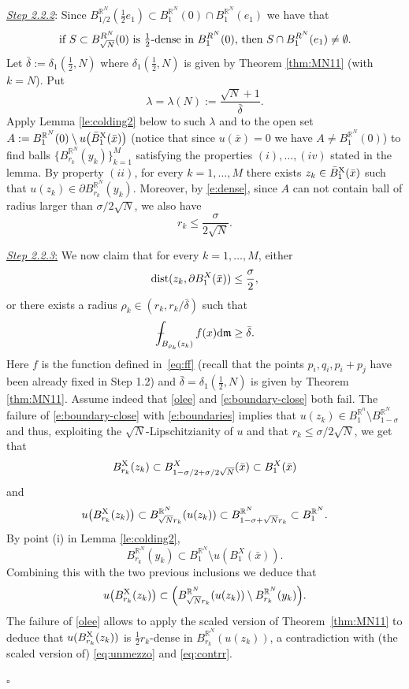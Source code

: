 \documentclass[reqno,11pt]{article}
\numberwithin{equation}{section}
\newcommand{\R}{\mathbb{R}}
\newcommand{\mm}{{\mbox{\boldmath$m$}}}
\renewcommand{\d}{{\mathrm d}}
\newcommand{\mean}[1]{\,-\hskip-1.08em\int_{#1}} %
\renewcommand{\mm}{\mathfrak m}                                %
\renewenvironment{proof}{\removelastskip\par\medskip   %
\noindent{\em Proof} \rm}{\penalty-20\null\hfill$\square$\par\medbreak}
\newcommand{\X}{{\rm X}}
\newcommand{\dist}{{\rm dist}}
\begin{document}
\begin{proof}
{\underline{\emph{Step 2.2.2}}:}  
{Since \(B_{1/2}^{\R^N}(\frac12 e_1)\subset B_{1}^{\R^N}(0)\cap B_1^{\R^N}(e_1)\) we have that
\begin{equation}
\label{eq:unmezzo}
\text{if \(S\subset B^{\mathbb \R^N}_{\sqrt{N}}(0)\) is \(\tfrac12\)-dense in \(B^{\mathbb \R^N}_1(0)\), then  \(S\cap B^{\mathbb \R^N}_1(e_1)\ne \emptyset\)}.
\end{equation}
Let $\bar \delta:=\delta_1(\tfrac12,N)$ where \(\delta_1(\tfrac12,N)\) is  given by Theorem \ref{thm:MN11} (with \(k=N\)). Put
\[
\lambda=\lambda(N):=\frac{\sqrt N+1}{\bar\delta}.
\]
Apply Lemma \ref{le:colding2} below to such $\lambda$ and to the open set $A:=B^{\R^N}_1(0)\setminus u\big({\bar B^\X_1(\bar x)}\big)$ (notice that since $u(\bar x)=0$ we have $A\neq B^{\R^N}_1(0)$) to find balls  \(\{B^{\R^N}_{r_k}(y_k)\}_{k=1}^M\) satisfying the properties $(i),\ldots,(iv)$ stated in the lemma. By property $(ii)$, for every \(k=1,\dots,M\)  there exists \(z_k\in {\bar B_1^{\X}(\bar x)}\) such that \(u(z_k)\in \partial B^{\R^N}_{r_k}(y_k)\). 
Moreover, by \eqref{e:dense}, since \(A\) can not contain ball of radius larger than \(\sigma/2\sqrt{N}\),  we also have  
\[
r_{k}\le \frac{\sigma}{2\sqrt{N}}.
\]
}

{\underline{\emph{Step 2.2.3}:}  We now claim that for every \(k=1,\dots,M\), either 
\begin{equation}\label{e:boundary-close}
\dist(z_{k},\partial B_{1}^{X}(\bar x))\le \frac{\sigma}{2},
\end{equation}
or there exists a radius \(\rho_k\in (r_k, r_k/ \bar \delta)\) such that 
\begin{equation}\label{olee}
\mean{B_{\rho_k}(z_k)} f(x) \d \mm\ge  \bar \delta.
\end{equation}
Here \(f\) is the function defined in~\eqref{eq:ff} (recall that the points \(p_i, q_i, p_i+p_j\) have been already fixed in Step 1.2) and  \(\bar \delta=\delta_1(\tfrac12,N)\) is  given by Theorem \ref{thm:MN11}. Assume indeed that \eqref{olee} and \eqref{e:boundary-close} both fail. The failure of  \eqref{e:boundary-close} with   \eqref{e:boundaries}  implies that \(u(z_{k})\in B^{\R^{n}}_{1}\setminus B^{\R^{N}}_{1-\sigma}\) and thus,  exploiting the  \(\sqrt{N}\)-Lipschitzianity of \(u\)   and that  \(r_{k}\le\sigma/2 \sqrt{N}\), we get that 
\[
B^\X_{r_k}(z_k)\subset B^{X}_{1-\sigma/2+\sigma/2\sqrt N}(\bar x)\subset B^{X}_{1}(\bar x)
\]
and
\[
u\big(B^\X_{r_k}(z_k)\big) \subset B^{\R^N}_{\sqrt{N} r_k}(u(z_k)) \subset B_{1-\sigma +\sqrt{N}r_{k}}^{\R^{N}} \subset B_{1}^{\R^{N}}.
\]
By point (i) in Lemma \ref{le:colding2}, 
\[
B^{\R^N}_{r_k} (y_k)\subset B_{1}^{\R^{N}}\setminus u(B^{X}_{1}(\bar x)).
\]
Combining this with the two previous inclusions we deduce that  
\begin{equation}\label{eq:contrr}
u\big(B^\X_{r_k}(z_k)\big)\subset   \Big(B^{\R^N}_{\sqrt{N} r_k}(u(z_k))\setminus B^{\R^N}_{r_k} (y_k)\Big).
\end{equation}
The failure of \eqref{olee} allows to apply the scaled version of  Theorem~\ref{thm:MN11} to   deduce that  $u(B^\X_{r_k} (z_k))$ is \(\tfrac12 r_k\)-dense in $B^{\R^N}_{r_k}(u(z_k))$, a contradiction with (the scaled version of) \eqref{eq:unmezzo} and  \eqref{eq:contrr}.
}



\end{proof}
\end{document}
